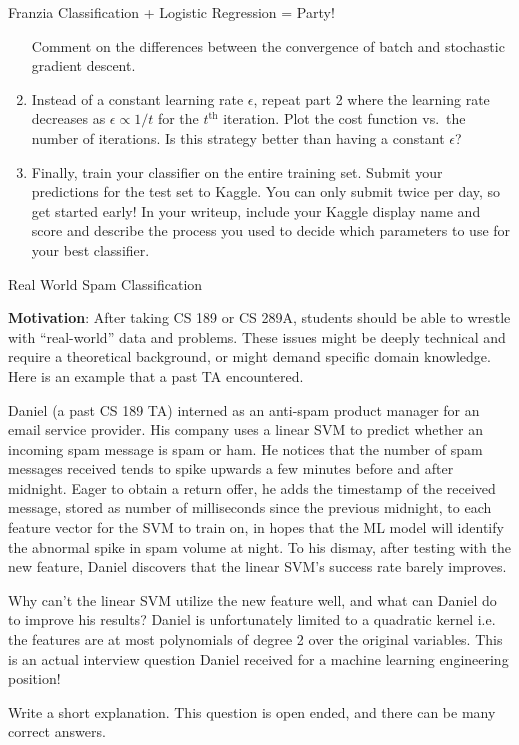 \documentclass[section]{problemset}
\begin{document}
\begin{problem}{Franzia Classification + Logistic Regression = Party!}
\begin{enumerate}
  Comment on the differences between the convergence of batch and stochastic
  gradient descent.

\item Instead of a constant learning rate $\epsilon$, repeat part 2 where the
  learning rate decreases as $\epsilon \propto 1/t$ for the $t^\mathrm{th}$
  iteration. Plot the cost function vs.\ the number of iterations. Is this
  strategy better than having a constant $\epsilon$?

\item Finally, train your classifier on the entire training set. Submit your
  predictions for the test set to Kaggle. You can only submit twice per day, so
  get started early! In your writeup, include your Kaggle display name and
  score and describe the process you used to decide which parameters to use for
  your best classifier.

\end{enumerate}

\end{problem}


\newpage


\begin{problem}{Real World Spam Classification}


\textbf{Motivation}: After taking CS 189 or CS 289A, students should be able to wrestle with ``real-world'' data and problems. These issues might be deeply technical and require a theoretical background, or might demand specific domain knowledge. Here is an example that a past TA encountered.

Daniel (a past CS 189 TA) interned as an anti-spam product manager for an email service provider. His company uses a linear SVM to predict whether an incoming spam message is spam or ham. He notices that the number of spam messages received tends to spike upwards a few minutes before and after midnight. Eager to obtain a return offer, he adds the timestamp of the received message, stored as number of milliseconds since the previous midnight, to each feature vector for the SVM to train on, in hopes that the ML model will identify the abnormal spike in spam volume at night. To his dismay, after testing with the new feature, Daniel discovers that the linear SVM's success rate barely improves.

Why can't the linear SVM utilize the new feature well, and what can Daniel do to improve his results? Daniel is unfortunately limited to a quadratic kernel i.e. the features are at most polynomials of degree 2 over the original variables. This is an actual interview question Daniel received for a machine learning engineering position!

Write a short explanation. This question is open ended, and there can be many correct answers.

\end{problem}
\end{document}
